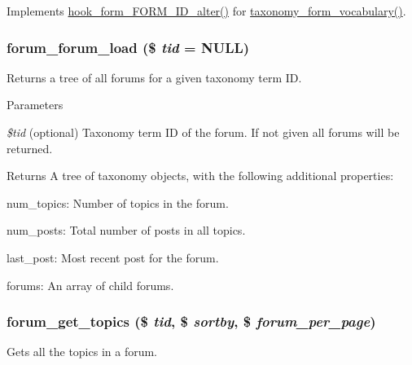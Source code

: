 \label{forum_8module_a3702bf881db6198891a4e019ab7b7ffe}
Implements \hyperlink{group__hooks_ga8d4a4089551493d55911bd5c4f218264}{hook\_\-form\_\-FORM\_\-ID\_\-alter()} for \hyperlink{group__forms_gafb93f170208a8c9c125b31ac91e1f966}{taxonomy\_\-form\_\-vocabulary()}. \hypertarget{forum_8module_afb6e17e15a5d0b24b812a6f628e4583f}{
\subsubsection[{forum\_\-forum\_\-load}]{\setlength{\rightskip}{0pt plus 5cm}forum\_\-forum\_\-load (\$ {\em tid} = {\ttfamily NULL})}}
\label{forum_8module_afb6e17e15a5d0b24b812a6f628e4583f}
Returns a tree of all forums for a given taxonomy term ID.


\begin{DoxyParams}{Parameters}
\item[{\em \$tid}](optional) Taxonomy term ID of the forum. If not given all forums will be returned.\end{DoxyParams}
\begin{DoxyReturn}{Returns}
A tree of taxonomy objects, with the following additional properties:
\begin{DoxyItemize}
\item num\_\-topics: Number of topics in the forum.
\item num\_\-posts: Total number of posts in all topics.
\item last\_\-post: Most recent post for the forum.
\item forums: An array of child forums. 
\end{DoxyItemize}
\end{DoxyReturn}
\hypertarget{forum_8module_a507f0536bf998390e20bc196e5f58b11}{
\subsubsection[{forum\_\-get\_\-topics}]{\setlength{\rightskip}{0pt plus 5cm}forum\_\-get\_\-topics (\$ {\em tid}, \/  \$ {\em sortby}, \/  \$ {\em forum\_\-per\_\-page})}}
\label{forum_8module_a507f0536bf998390e20bc196e5f58b11}
Gets all the topics in a forum.


